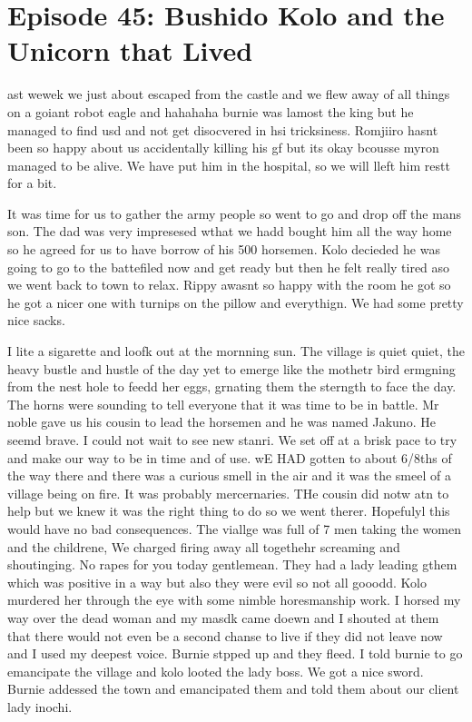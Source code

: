 \section{Episode 45: Bushido Kolo and the Unicorn that Lived}

\medskip

ast wewek we just about escaped from the castle and we flew away of all things on a goiant robot eagle and hahahaha burnie was lamost the king but he managed to find usd and not get disocvered in hsi tricksiness. Romjiiro hasnt been so happy about us accidentally killing his gf but its okay bcousse myron managed to be alive. We have put him in the hospital, so we will lleft him restt for a bit.\medskip

It was time for us to gather the army people so went to go and drop off the mans son. The dad was very impresesed wthat we hadd bought him all the way home so he agreed for us to have borrow of his 500 horsemen. Kolo decieded he was going to go to the battefiled now and get ready but then he felt really tired aso we went back to town to relax. Rippy awasnt so happy with the room he got so he got a nicer one with turnips on the pillow and everythign. We had some pretty nice sacks.\medskip

I lite a sigarette and loofk out at the mornning sun. The village is quiet quiet, the heavy bustle and hustle of the day yet to emerge like the mothetr bird ermgning from the nest hole to feedd her eggs, grnating them the sterngth to face the day. The horns were sounding to tell everyone that it was time to be in battle. Mr noble gave us his cousin to lead the horsemen and he was named Jakuno. He seemd brave. I could not wait to see new stanri. We set off at a brisk pace to try and make our way to be in time and of use. wE HAD gotten to about 6/8ths of the way there and there was a curious smell in the air and it was the smeel of a village being on fire. It was probably mercernaries. THe cousin did notw atn to help but we knew it was the right thing to do so we went therer. Hopefulyl this would have no bad consequences. The viallge was full of 7 men taking the women and the childrene, We charged firing away all togethehr screaming and shoutinging. No rapes for you today gentlemean. They had a lady leading gthem which was positive in a way but also they were evil so not all gooodd. Kolo murdered her through the eye with some nimble horesmanship work. I horsed my way over the dead woman and my masdk came doewn and I shouted at them that there would not even be a second chanse to live if they did not leave now and I used my deepest voice. Burnie stpped up and they fleed. I told burnie to go emancipate the village and kolo looted the lady boss. We got a nice sword. Burnie addessed the town and emancipated them and told them about our client lady inochi.\medskip

